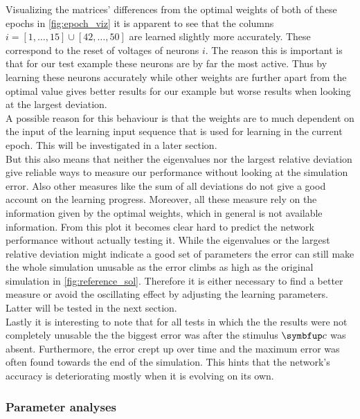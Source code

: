Visualizing the matrices' differences from the optimal weights  of both of these epochs in \cref{fig:epoch_viz} it is apparent to see that the columns $i = [1,\dots,15] \cup [42,\dots,50]$  are learned slightly more accurately. These correspond to the reset of voltages of neurons $i$. The reason this is important is that for our test example these neurons are by far the most active. Thus by learning these neurons accurately while other weights are further apart from the optimal value gives better results for our example but worse results when looking at the largest deviation.\\
A possible reason for this behaviour is that the weights are to much dependent on the input of the learning input sequence that is used for learning in the current epoch. This will be investigated in a later section.\\
But this also means that neither the eigenvalues nor the largest relative deviation give reliable ways to measure our performance without looking at the simulation error. Also other measures like the sum of all deviations do not give a good account on the learning progress. Moreover, all these measure rely on the information given by the optimal weights, which in general is not available  information. From this plot it becomes clear hard to predict the network performance without actually testing it. While the eigenvalues or the largest relative deviation might indicate a good set of parameters the error can still make the whole simulation unusable as the error climbs as high as the original simulation in \cref{fig:reference_sol}. Therefore it is either necessary to find a better measure or avoid the oscillating effect by adjusting the learning parameters. Latter will be tested in the next section.\\
Lastly it is interesting to note that for all tests in which the the results were not completely unusable the the biggest error was after the stimulus $\bmu{c}$ was absent. Furthermore, the error crept up over time and the maximum error was often found towards the end of the simulation. This hints that the network's accuracy is deteriorating mostly when it is evolving on its own.\\

\subsubsection{Parameter analyses}
